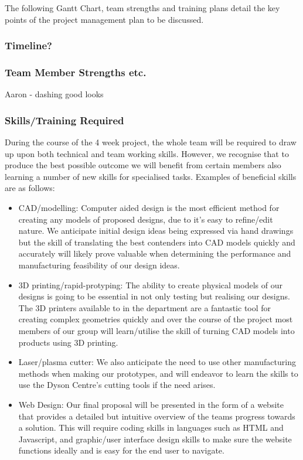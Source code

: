 \documentclass[12pt]{article}
\begin{document}
The following Gantt Chart, team strengths and training plans detail the key points of the project management plan to be discussed.
\subsubsection{Timeline?}

\subsubsection{Team Member Strengths etc.}
Aaron - dashing good looks

\subsubsection{Skills/Training Required}

During the course of the 4 week project, the whole team will be required to draw up upon both technical and team working skills. However, we recognise that to produce the best possible outcome we will benefit from certain members also learning a number of new skills for specialised tasks. Examples of beneficial skills are as follows:  

\begin{itemize}
\item CAD/modelling: Computer aided design is the most efficient method for creating any models of proposed designs, due to it's easy to refine/edit nature. We anticipate initial design ideas being expressed via hand drawings but the skill of translating the best contenders into CAD models quickly and accurately will likely prove valuable when determining the performance and manufacturing feasibility of our design ideas. 
\item 3D printing/rapid-protyping: The ability to create physical models of our designs is going to be essential in not only testing but realising our designs. The 3D printers available to in the department are a fantastic tool for creating complex geometries quickly and over the course of the project most members of our group will learn/utilise the skill of turning CAD models into products using 3D printing. 
\item Laser/plasma cutter: We also anticipate the need to use other manufacturing methods when making our prototypes, and will endeavor to learn the skills to use the Dyson Centre's cutting tools if the need arises. 
\item Web Design: Our final proposal will be presented in the form of a website that provides a detailed but intuitive overview of the teams progress towards a solution. This will require coding skills in languages such as HTML and Javascript, and graphic/user interface design skills to make sure the website functions ideally and is easy for the end user to navigate.  
\end{itemize}
 
\end{document}

